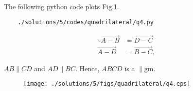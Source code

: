 The following python code plots Fig.\ref{fig:2.2.5_qfour}.
	\begin{lstlisting}
	./solutions/5/codes/quadrilateral/q4.py
	\end{lstlisting}
	

	\begin{align}
\because	\vec{A - B}&=\vec{D - C}
	\\
	\vec{A - D}&=\vec{B - C},
	\end{align}
	
	$AB \parallel CD$ and $AD \parallel BC$.  Hence, $ABCD$ is a $\parallel$gm.
	\begin{figure}[!ht]
	\centering
	\texttt{[image: ./solutions/5/figs/quadrilateral/q4.eps]}
	\caption{}
	\label{fig:2.2.5_qfour}	
	\end{figure}

